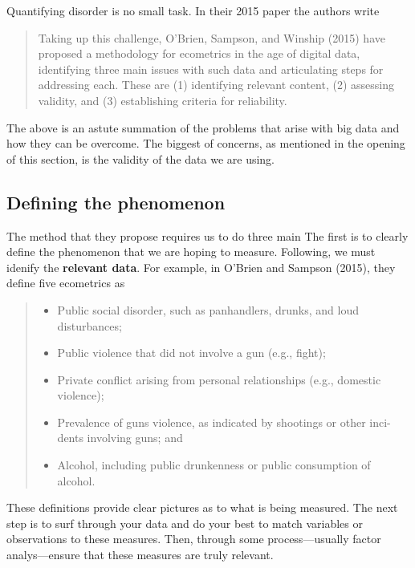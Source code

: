 \documentclass[
]{book}
\providecommand{\tightlist}{%
  \setlength{\itemsep}{0pt}\setlength{\parskip}{0pt}}
\begin{document}
Quantifying disorder is no small task. In their 2015 paper the authors write

\begin{quote}
Taking up this challenge, O'Brien, Sampson, and Winship (2015) have proposed a methodology for ecometrics in the age of digital data, identifying three main issues with such data and articulating steps for addressing each. These are (1) identifying relevant content, (2) assessing validity, and (3) establishing criteria for reliability.
\end{quote}

The above is an astute summation of the problems that arise with big data and how they can be overcome. The biggest of concerns, as mentioned in the opening of this section, is the validity of the data we are using.

\hypertarget{defining-the-phenomenon}{%
\subsection{Defining the phenomenon}\label{defining-the-phenomenon}}

The method that they propose requires us to do three main The first is to clearly define the phenomenon that we are hoping to measure. Following, we must idenify the \textbf{relevant data}. For example, in O'Brien and Sampson (2015), they define five ecometrics as

\begin{quote}
\begin{itemize}
\tightlist
\item
  Public social disorder, such as panhandlers, drunks, and loud disturbances;
\item
  Public violence that did not involve a gun (e.g., fight);
\item
  Private conflict arising from personal relationships (e.g., domestic
  violence);
\item
  Prevalence of guns violence, as indicated by shootings or other inci-
  dents involving guns; and
\item
  Alcohol, including public drunkenness or public consumption of
  alcohol.
\end{itemize}
\end{quote}

These definitions provide clear pictures as to what is being measured. The next step is to surf through your data and do your best to match variables or observations to these measures. Then, through some process---usually factor analys---ensure that these measures are truly relevant.
\end{document}
